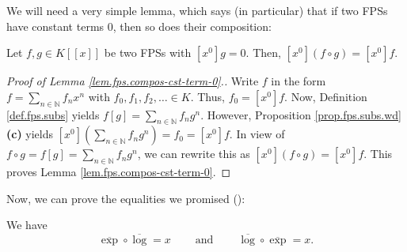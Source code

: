 We will need a very simple lemma, which says (in particular) that if two FPSs
have constant terms $0$, then so does their composition:

\begin{lemma}
\label{lem.fps.compos-cst-term-0}Let $f,g\in K\left[  \left[  x\right]
\right]  $ be two FPSs with $\left[  x^{0}\right]  g=0$. Then, $\left[
x^{0}\right]  \left(  f\circ g\right)  =\left[  x^{0}\right]  f$.
\end{lemma}

\begin{proof}
[Proof of Lemma \ref{lem.fps.compos-cst-term-0}.]Write $f$ in the form
$f=\sum_{n\in\mathbb{N}}f_{n}x^{n}$ with $f_{0},f_{1},f_{2},\ldots\in K$.
Thus, $f_{0}=\left[  x^{0}\right]  f$. Now, Definition \ref{def.fps.subs}
yields $f\left[  g\right]  =\sum_{n\in\mathbb{N}}f_{n}g^{n}$. However,
Proposition \ref{prop.fps.subs.wd} \textbf{(c)} yields $\left[  x^{0}\right]
\left(  \sum_{n\in\mathbb{N}}f_{n}g^{n}\right)  =f_{0}=\left[  x^{0}\right]
f$. In view of $f\circ g=f\left[  g\right]  =\sum_{n\in\mathbb{N}}f_{n}g^{n}$,
we can rewrite this as $\left[  x^{0}\right]  \left(  f\circ g\right)
=\left[  x^{0}\right]  f$. This proves Lemma \ref{lem.fps.compos-cst-term-0}.
\end{proof}

Now, we can prove the equalities we promised (\cite[Theorem 0.1]{logexp}):

\begin{theorem}
\label{thm.fps.exp-log-inv}We have%
\[
\overline{\exp}\circ\overline{\log}=x\ \ \ \ \ \ \ \ \ \ \text{and}%
\ \ \ \ \ \ \ \ \ \ \overline{\log}\circ\overline{\exp}=x.
\]

\end{theorem}

